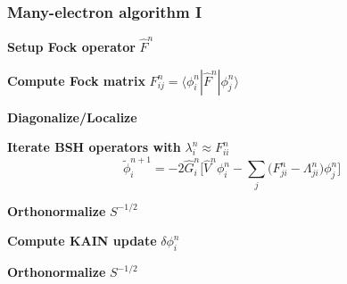 \documentclass[mathserif, 10pt]{beamer}
\begin{document}
\begin{frame}
    \frametitle{Many-electron algorithm I}
    \centering
    \textbf{Setup Fock operator} $\hat{F}^n$

    \vspace{5mm}

    \textbf{Compute Fock matrix} $F_{ij}^n = \langle\phi_i^n|\hat{F}^n|\phi_j^n\rangle$

    \vspace{5mm}

    \textbf{Diagonalize/Localize}

    \vspace{5mm}

    \textbf{Iterate BSH operators with} $\lambda_i^n \approx F_{ii}^n$
    \begin{equation}
	\nonumber
        \tilde{\phi}_i^{n+1} = -2\hat{G}_i^n \bigg[\hat{V}^n\phi_i^n -
        \sum_j\big(F_{ji}^n - \Lambda_{ji}^n\big)\phi_j^n\bigg]
    \end{equation}

    \vspace{2mm}

    \textbf{Orthonormalize} $S^{-1/2}$

    \vspace{5mm}

    \textbf{Compute KAIN update} $\delta\phi_i^n$

    \vspace{5mm}

    \textbf{Orthonormalize} $S^{-1/2}$

\end{frame}
\end{document}
